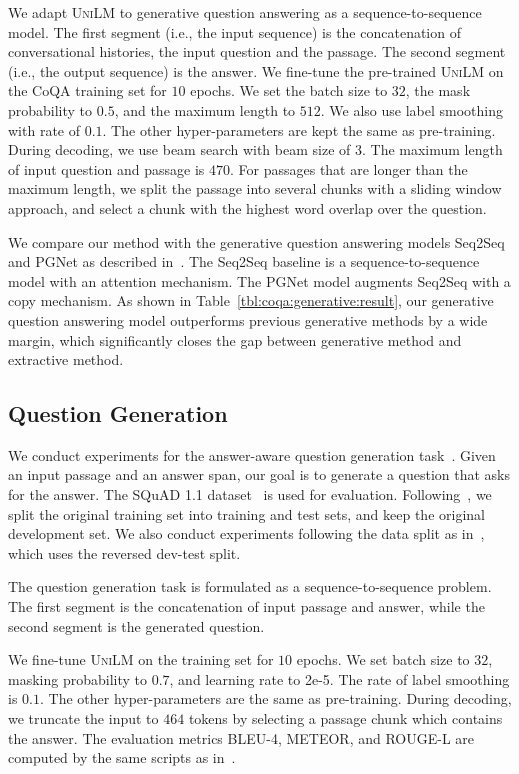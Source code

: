\documentclass{article}
\newcommand\ours{\textsc{UniLM}}
\begin{document}
We adapt \ours{} to generative question answering as a sequence-to-sequence model.
The first segment (i.e., the input sequence) is the concatenation of conversational histories, the input question and the passage. The second segment (i.e., the output sequence) is the answer. 
%
We fine-tune the pre-trained \ours{} on the CoQA training set for $10$ epochs. We set the batch size to $32$, the mask probability to $0.5$, and the maximum length to $512$. We also use label smoothing with rate of $0.1$.
The other hyper-parameters are kept the same as pre-training. 
% 
During decoding, we use beam search with beam size of $3$. The maximum length of input question and passage is $470$. For passages that are longer than the maximum length, we split the passage into several chunks with a sliding window approach, and select a chunk with the highest word overlap over the question.

We compare our method with the generative question answering models Seq2Seq and PGNet as described in~\cite{coqa}.
The Seq2Seq baseline is a sequence-to-sequence model with an attention mechanism. The PGNet model augments Seq2Seq with a copy mechanism.
As shown in Table~\ref{tbl:coqa:generative:result}, our generative question answering model outperforms previous generative methods by a wide margin, which significantly closes the gap between generative method and extractive method.

\subsection{Question Generation}
\label{sec:qg}

We conduct experiments for the answer-aware question generation task~\cite{zhou-qg-2017}. Given an input passage and an answer span, our goal is to generate a question that asks for the answer.
The SQuAD 1.1 dataset~\cite{squad1} is used for evaluation.
Following~\cite{du-qg-2017}, we split the original training set into training and test sets, and keep the original development set.
We also conduct experiments following the data split as in~\cite{zhao-qg-2018}, which uses the reversed dev-test split.

The question generation task is formulated as a sequence-to-sequence problem. The first segment is the concatenation of input passage and answer, while the second segment is the generated question.

We fine-tune \ours{} on the training set for $10$ epochs. We set batch size to $32$, masking probability to $0.7$, and learning rate to 2e-5. The rate of label smoothing is $0.1$. The other hyper-parameters are the same as pre-training.
During decoding, we truncate the input to $464$ tokens by selecting a passage chunk which contains the answer.
The evaluation metrics BLEU-4, METEOR, and ROUGE-L are computed by the same scripts as in~\cite{du-qg-2017}.
\end{document}
